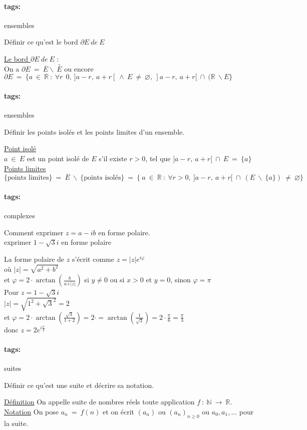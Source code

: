 \documentclass[12pt]{article}
\newcommand*{\xfield}[1]{\begin{mdframed}\centering #1\end{mdframed}\bigskip}
\newenvironment{note}{}{}
\newcommand*{\tags}[1]{\paragraph{tags: }#1}
\begin{document}
\begin{note}
	\tags{ensembles}
    \xfield{ Définir ce qu'est le bord $\partial E\ de\ E$}
    \xfield{
        \underline{Le bord $\partial E\ de\ E$} :\\
        On a $\partial E\ =\ \overline E \backslash\ \overset{\circ}{E}$ ou encore $\partial E\ =\ \{ a\ \in\ \mathbb{R}\ :\ \forall r\ \> 0,\ ] a-r,\ a+r[\ \wedge\ E\ \neq\ \varnothing ,\ ] a-r,\ a+r[\ \cap\ (\mathbb{R}\ \backslash E \}$
    }
\end{note}

\begin{note}
	\tags{ensembles}
    \xfield{Définir les points isolés et les points limites d'un ensemble.}
    \xfield{
        \underline{Point isolé}\\ $a\ \in\ E$ est un point isolé de $E$ s'il existe $r > 0$, tel que $]a-r,\ a+r[\ \cap\ E\ =\ \{a\}$\\
        \underline{Points limites}\\
        $\text{\{points limites\}}\ =\ \overline{E}\ \backslash\ \text{\{points isolés\}}\ =\ \{\ a\ \in\ \mathbb{R}\ :\ \forall r >0,\ ]a-r,\ a+r[\ \cap\ (E\ \backslash\ \{a\})\ \neq\ \varnothing \}$
    }
\end{note}

\begin{note}
	\tags{complexes}
	\xfield{Comment exprimer $z=a-ib$ en forme polaire.
	\\exprimer $1-\sqrt{3}i$ en forme polaire}
	\xfield{La forme polaire de $z$ s'écrit comme $z= \vert z \vert e^{i \varphi}$ \\
	où $\vert z \vert = \sqrt{a^2+b^2}$\\
	et $\varphi = 2 \cdot \arctan(\frac{b}{a+\vert z \vert})$ si $y \neq 0$ ou si $x > 0$ et $y = 0$, sinon $\varphi = \pi$\\
	Pour $z = 1-\sqrt{3}i$\\
	$\vert z \vert = \sqrt{1^2+\sqrt{3}^2} = 2$\\
	et $\varphi =  2 \cdot \arctan(\frac{\sqrt{3}}{1+2}) = 2 \cdot = \arctan(\frac{1}{\sqrt{3}})=2 \cdot \frac{\pi}{6} = \frac{\pi}{3}$\\
	donc $z= 2 e^{i \frac{\pi}{3}}$}
\end{note}

\begin{note}
	\tags{suites}
    \xfield{Définir ce qu'est une suite et décrire sa notation.}
    \xfield{
        \underline{Définition} On appelle suite de nombres réels toute application $f\ :\ \mathbb{N}\ \rightarrow\ \mathbb{R}$.\\
        \underline{Notation} On pose $a_n\ =\ f(n)$ et on écrit $(a_n)$ ou $(a_n)_{n \ge 0}$ ou $a_0,a_1,$... pour la suite.
    }
\end{note}
\end{document}
